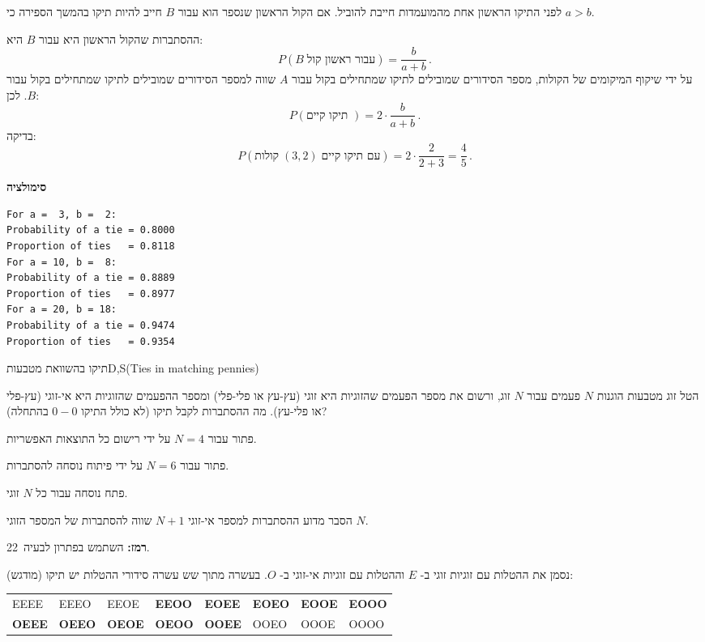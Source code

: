 לפני התיקו הראשון אחת מהמועמדות חייבת להוביל. אם הקול הראשון שנספר הוא עבור 
$B$
חייב להיות תיקו בהמשך הספירה כי
$a>b$.

ההסתברות שהקול הראשון היא עבור 
$B$
היא:
\[
P(B\;\textrm{עבור ראשון קול})=\frac{b}{a+b}\,.
\]
על ידי שיקוף המיקומים של הקולות, מספר הסידורים שמובילים לתיקו שמתחילים בקול עבור
$A$
שווה למספר הסידורים שמובילים לתיקו שמתחילים בקול עבור
$B$. 
לכן:
\[
P(\textrm{תיקו קיים })=2\cdot\frac{b}{a+b}\,.
\]
בדיקה:
\[
P(\textrm{קולות}\;(3,2)\;\textrm{עם תיקו קיים})=2\cdot\frac{2}{2+3}=\frac{4}{5}\,.
\]

\textbf{סימולציה}
\begin{verbatim}
For a =  3, b =  2:
Probability of a tie = 0.8000
Proportion of ties   = 0.8118
For a = 10, b =  8:
Probability of a tie = 0.8889
Proportion of ties   = 0.8977
For a = 20, b = 18:
Probability of a tie = 0.9474
Proportion of ties   = 0.9354
\end{verbatim}



\begin{prob}{תיקו בהשוואת מטבעות}{D,S}{(Ties in matching pennies)}

הטל זוג מטבעות הוגנות
$N$
פעמים עבור
$N$
זוג, ורשום את מספר הפעמים שהזוגיות היא זוגי (עץ-עץ או פלי-פלי) ומספר ההפעמים שהזוגיות היא אי-זוגי (עץ-פלי או פלי-עץ). מה ההסתברות לקבל תיקו (לא כולל התיקו 
$0-0$
בהתחלה)?

פתור עבור 
$N=4$
על ידי רישום כל התוצאות האפשריות.

פתור עבור
$N=6$
על ידי פיתוח נוסחה להסתברות.

פתח נוסחה עבור כל
$N$
זוגי.

הסבר מדוע ההסתברות למספר אי-זוגי
$N+1$
שווה להסתברות של המספר הזוגי
$N$.

\textbf{רמז:}
השתמש בפתרון לבעיה~22.
\end{prob}

\solution{}

נסמן את ההטלות עם זוגיות זוגי ב-%
$E$
וההטלות עם זוגיות אי-זוגי ב-%
$O$.
בעשרה מתוך שש עשרה סידורי ההטלות יש תיקו (מודגש):
\begin{center}
\begin{tabular}{llllllll}
EEEE & EEEO & EEOE & \textbf{EEOO} & \textbf{EOEE} & \textbf{EOEO} &\textbf{EOOE} & \textbf{EOOO}\\
\textbf{OEEE} & \textbf{OEEO} & \textbf{OEOE} & \textbf{OEOO} & \textbf{OOEE} & OOEO&OOOE & OOOO
\end{tabular}
\end{center}

